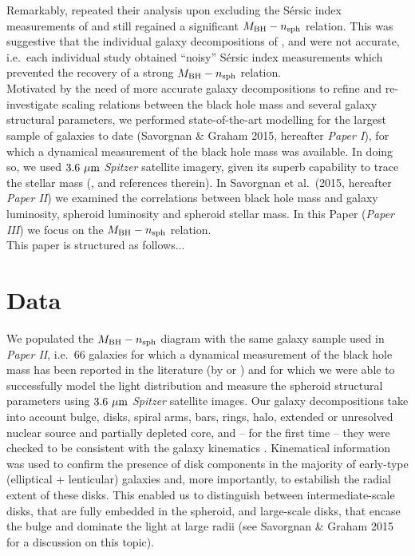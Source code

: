 \documentclass[preprint2]{emulateapj}
\begin{document}
Remarkably, \cite{savorgnan2013} repeated their analysis upon excluding the S\'ersic index measurements of \cite{grahamdriver2007} 
and still regained a significant $M_{\rm BH} - n_{\rm sph}$ relation. 
This was suggestive that the individual galaxy decompositions of \cite{sani2011}, \cite{vika2012} and \cite{beifiori2012} were not accurate, 
i.e.~each individual study obtained ``noisy'' S\'ersic index measurements 
which prevented the recovery of a strong $M_{\rm BH} - n_{\rm sph}$ relation. \\
Motivated by the need of more accurate galaxy decompositions to refine and re-investigate scaling relations 
between the black hole mass and several galaxy structural parameters, 
we performed state-of-the-art modelling for the largest sample of galaxies to date (Savorgnan \& Graham 2015, hereafter \emph{Paper I}),  
for which a dynamical measurement of the black hole mass was available.
In doing so, we used $3.6\rm~\mu m$ \emph{Spitzer} satellite imagery, 
given its superb capability to trace the stellar mass (\citealt{sheth2010}, and references therein). 
In Savorgnan et al.~(2015, hereafter \emph{Paper II}) we examined the correlations between black hole mass and 
galaxy luminosity, spheroid luminosity and spheroid stellar mass. 
In this Paper (\emph{Paper III}) we focus on the $M_{\rm BH} - n_{\rm sph}$ relation. \\
This paper is structured as follows...


\section{Data}
We populated the $M_{\rm BH} - n_{\rm sph}$ diagram with the same galaxy sample used in \emph{Paper II}, 
i.e.~66 galaxies for which a dynamical measurement of the black hole mass has been reported in the literature 
(by \citealt{grahamscott2013} or \citealt{rusli2013}) 
and for which we were able to successfully model the light distribution and measure the spheroid structural parameters 
using $3.6\rm~\mu m$ \emph{Spitzer} satellite images. 
Our galaxy decompositions take into account bulge, disks, spiral arms, bars, rings, halo, 
extended or unresolved nuclear source and partially depleted core, 
and -- for the first time -- they were checked to be consistent with the galaxy kinematics 
\citep{atlas3dIII,scott2014,arnold2014}. 
Kinematical information was used to confirm the presence of disk components 
in the majority of early-type (elliptical + lenticular) galaxies and, more importantly,  
to estabilish the radial extent of these disks. 
This enabled us to distinguish between intermediate-scale disks, 
that are fully embedded in the spheroid,  
and large-scale disks, that encase the bulge and dominate the light at large radii 
(see Savorgnan \& Graham 2015 for a discussion on this topic).  
\end{document}
